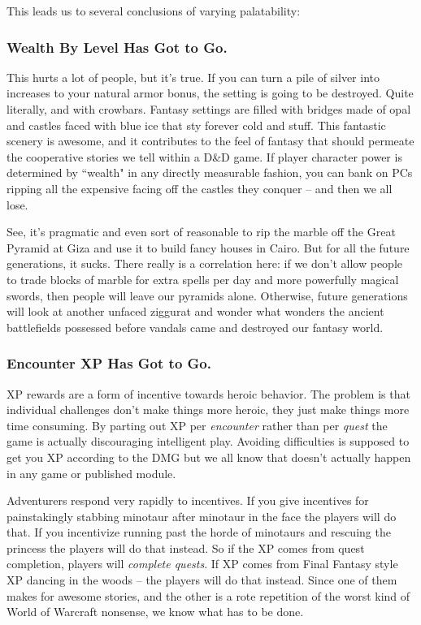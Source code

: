This leads us to several conclusions of varying palatability:

\subsubsection{Wealth By Level Has Got to Go.}

This hurts a lot of people, but it's true. If you can turn a pile of silver into increases to your natural armor bonus, the setting is going to be destroyed. Quite literally, and with crowbars. Fantasy settings are filled with bridges made of opal and castles faced with blue ice that sty forever cold and stuff. This fantastic scenery is awesome, and it contributes to the feel of fantasy that should permeate the cooperative stories we tell within a D\&D game. If player character power is determined by ``wealth" in any directly measurable fashion, you can bank on PCs ripping all the expensive facing off the castles they conquer -- and then we all lose.

See, it's pragmatic and even sort of reasonable to rip the marble off the Great Pyramid at Giza and use it to build fancy houses in Cairo. But for all the future generations, it sucks. There really is a correlation here: if we don't allow people to trade blocks of marble for extra spells per day and more powerfully magical swords, then people will leave our pyramids alone. Otherwise, future generations will look at another unfaced ziggurat and wonder what wonders the ancient battlefields possessed before vandals came and destroyed our fantasy world.

\subsubsection{Encounter XP Has Got to Go.}

XP rewards are a form of incentive towards heroic behavior. The problem is that individual challenges don't make things more heroic, they just make things more time consuming. By parting out XP per \textit{encounter} rather than per \textit{quest} the game is actually discouraging intelligent play. Avoiding difficulties is supposed to get you XP according to the DMG but we all know that doesn't actually happen in any game or published module.

Adventurers respond very rapidly to incentives. If you give incentives for painstakingly stabbing minotaur after minotaur in the face the players will do that. If you incentivize running past the horde of minotaurs and rescuing the princess the players will do that instead. So if the XP comes from quest completion, players will \textit{complete quests}. If XP comes from Final Fantasy style XP dancing in the woods -- the players will do that instead. Since one of them makes for awesome stories, and the other is a rote repetition of the worst kind of World of Warcraft nonsense, we know what has to be done.

